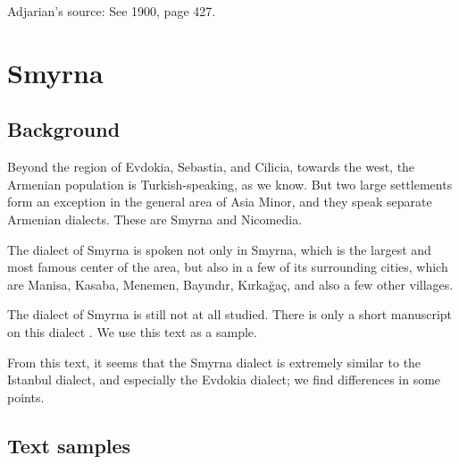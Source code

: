 Adjarian's source: See  1900, page 427. 








\chapter{Smyrna} \label{chapter:Smyrna}
\section{Background}

\begin{adjarianpage}\label{page:239}\end{adjarianpage}%

Beyond the region of Evdokia, Sebastia, and Cilicia, towards the west, the   Armenian population is  Turkish-speaking, as we know. But two large settlements form an exception in the general area of Asia Minor, and they speak   separate Armenian dialects. These are Smyrna and Nicomedia. 

The dialect of Smyrna is spoken not only in Smyrna, which is the largest and most famous center of the area, but also in a few of its surrounding cities, which are Manisa, Kasaba, Menemen, Bayındır, Kırkağaç, and also a few other villages. 

The dialect of Smyrna is still not at all studied. There is only a short manuscript on this dialect \citep[300]{Kosian-smyrna}. We use this text as a sample. 

From this text, it seems that the Smyrna dialect is extremely similar to the Istanbul dialect, and especially the Evdokia dialect; we find differences in some points. 


\section{Text samples}

